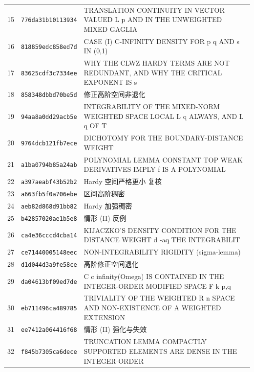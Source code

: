 \begin{footnotesize}
\begin{longtable}{@{}p{1.0cm}p{4.3cm}p{8.1cm}@{}}
15 & \texttt{776da31b10113934} & TRANSLATION CONTINUITY IN VECTOR-VALUED L p AND IN THE UNWEIGHTED MIXED GAGLIA \\
16 & \texttt{818859edc858ed7d} & CASE (I) C-INFINITY DENSITY FOR p q AND s IN (0,1) \\
17 & \texttt{83625cdf3c7334ee} & WHY THE CLWZ HARDY TERMS ARE NOT REDUNDANT, AND WHY THE CRITICAL EXPONENT IS s \\
18 & \texttt{858348dbbd70be5d} & 修正高阶空间非退化 \\
19 & \texttt{94aa8a0dd29acb5e} & INTEGRABILITY OF THE MIXED-NORM WEIGHTED SPACE LOCAL L q ALWAYS, AND L q OF T \\
20 & \texttt{9764dcb121fb7ece} & DICHOTOMY FOR THE BOUNDARY-DISTANCE WEIGHT \\
21 & \texttt{a1ba0794b85a24ab} & POLYNOMIAL LEMMA CONSTANT TOP WEAK DERIVATIVES IMPLY f IS A POLYNOMIAL \\
22 & \texttt{a397aeabf43b52b2} & Hardy 空间严格更小 复核 \\
23 & \texttt{a663fb5f0a706ebe} & 区间高阶稠密 \\
24 & \texttt{aeb82d868d91bb82} & Hardy 加强稠密 \\
25 & \texttt{b42857020ae1b5e8} & 情形 (II) 反例 \\
26 & \texttt{ca4e36cccd4cba14} & KIJACZKO'S DENSITY CONDITION FOR THE DISTANCE WEIGHT d -aq THE INTEGRABILIT \\
27 & \texttt{ce71440005148eec} & NON-INTEGRABILITY RIGIDITY (sigma-lemma) \\
28 & \texttt{d1d044d3a9fe58ce} & 高阶修正空间退化 \\
29 & \texttt{da04613bf09ed7de} & C c infinity(Omega) IS CONTAINED IN THE INTEGER-ORDER MODIFIED SPACE F k p,q \\
30 & \texttt{eb711496ca489785} & TRIVIALITY OF THE WEIGHTED R n SPACE AND NON-EXISTENCE OF A WEIGHTED EXTENSION \\
31 & \texttt{ee7412a064416f68} & 情形 (II) 强化与失效 \\
32 & \texttt{f845b7305ca6dece} & TRUNCATION LEMMA COMPACTLY SUPPORTED ELEMENTS ARE DENSE IN THE INTEGER-ORDER \\
\end{longtable}
\end{footnotesize}



